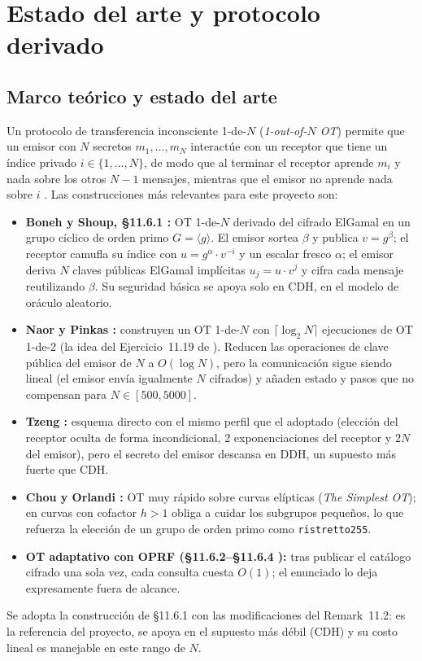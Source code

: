 \section{Estado del arte y protocolo derivado}
\label{sec:protocolo}

\subsection{Marco te\'orico y estado del arte}
Un protocolo de transferencia inconsciente 1-de-$N$ (\emph{1-out-of-$N$ OT})
permite que un emisor con $N$ secretos $m_1,\dots,m_N$ interact\'ue con un
receptor que tiene un \'indice privado $i \in \{1,\dots,N\}$, de modo que al
terminar el receptor aprende $m_i$ y nada sobre los otros $N-1$ mensajes,
mientras que el emisor no aprende nada sobre $i$ \cite{boneh-shoup-v06}.
Las construcciones m\'as relevantes para este proyecto son:
\begin{itemize}
\item \textbf{Boneh y Shoup, \S11.6.1 \cite{boneh-shoup-v06}:} OT 1-de-$N$
derivado del cifrado ElGamal en un grupo c\'iclico de orden primo
$G=\langle g\rangle$. El emisor sortea $\beta$ y publica $v = g^\beta$; el
receptor camufla su \'indice con $u = g^\alpha \cdot v^{-i}$ y un escalar
fresco $\alpha$; el emisor deriva $N$ claves p\'ublicas ElGamal impl\'icitas
$u_j = u \cdot v^j$ y cifra cada mensaje reutilizando $\beta$. Su seguridad
b\'asica se apoya solo en CDH, en el modelo de or\'aculo aleatorio.
\item \textbf{Naor y Pinkas \cite{naor-pinkas-soda01,naor-pinkas-joc05}:}
construyen un OT 1-de-$N$ con $\lceil \log_2 N \rceil$ ejecuciones de OT
1-de-2 (la idea del Ejercicio~11.19 de \cite{boneh-shoup-v06}). Reducen las
operaciones de clave p\'ublica del emisor de $N$ a $O(\log N)$, pero la
comunicaci\'on sigue siendo lineal (el emisor env\'ia igualmente $N$
cifrados) y a\~naden estado y pasos que no compensan para $N \in [500, 5000]$.
\item \textbf{Tzeng \cite{tzeng-pkc02}:} esquema directo con el mismo perfil
que el adoptado (elecci\'on del receptor oculta de forma incondicional, 2
exponenciaciones del receptor y $2N$ del emisor), pero el secreto del emisor
descansa en DDH, un supuesto m\'as fuerte que CDH.
\item \textbf{Chou y Orlandi \cite{chou-orlandi-simplestOT}:} OT muy r\'apido
sobre curvas el\'ipticas (\emph{The Simplest OT}); en curvas con cofactor
$h>1$ obliga a cuidar los subgrupos peque\~nos, lo que refuerza la elecci\'on
de un grupo de orden primo como \texttt{ristretto255}.
\item \textbf{OT adaptativo con OPRF (\S11.6.2--\S11.6.4
\cite{boneh-shoup-v06}):} tras publicar el cat\'alogo cifrado una sola vez,
cada consulta cuesta $O(1)$; el enunciado lo deja expresamente fuera de
alcance.
\end{itemize}
Se adopta la construcci\'on de \S11.6.1 con las modificaciones del
Remark~11.2: es la referencia del proyecto, se apoya en el supuesto m\'as
d\'ebil (CDH) y su costo lineal es manejable en este rango de $N$.

